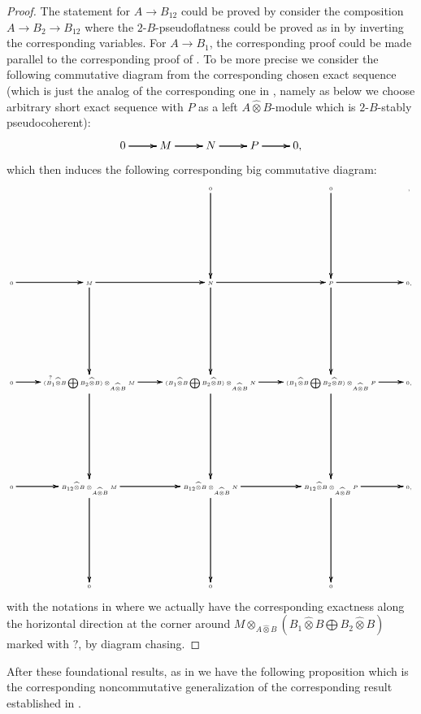 \documentclass[12pt]{amsart}
\theoremstyle{definition}
\numberwithin{equation}{section}
\begin{document}
\begin{proof}
The statement for $A\rightarrow B_{12}$ could be proved by consider the composition $A\rightarrow B_2\rightarrow B_{12}$ where the $2$-$B$-pseudoflatness could be proved as in \cite[Lemma 2.4.13]{KL2} by inverting the corresponding variables. For $A\rightarrow B_{1}$,
the corresponding proof could be made parallel to the corresponding proof of \cite[Lemma 2.4.13]{KL2}. To be more precise we consider the following commutative diagram from the corresponding chosen exact sequence (which is just the analog of the corresponding one in \cite[Remark 2.4.5]{KL2}, namely as below we choose arbitrary short exact sequence with $P$ as a left $A\widehat{\otimes}B$-module which is $2$-$B$-stably pseudocoherent):
\[
\xymatrix@C+0pc@R+0pc{
0   \ar[r]\ar[r]\ar[r] &M \ar[r]\ar[r]\ar[r] &N \ar[r]\ar[r]\ar[r] & P \ar[r]\ar[r]\ar[r] &0,
}
\]
which then induces the following corresponding big commutative diagram:
\[\tiny
\xymatrix@C+0pc@R+5pc{
& &0 \ar[d]\ar[d]\ar[d] &0 \ar[d]\ar[d]\ar[d] &,\\
0   \ar[r]\ar[r]\ar[r]  &M \ar[r]\ar[r]\ar[r] \ar[d]\ar[d]\ar[d] &N \ar[r]\ar[r]\ar[r] \ar[d]\ar[d]\ar[d] & P \ar[r]\ar[r]\ar[r] \ar[d]\ar[d]\ar[d] &0,\\
0   \ar[r]^?\ar[r]\ar[r] &({B_1\widehat{\otimes}B}\bigoplus {B_2\widehat{\otimes}B}) \otimes_{A\widehat{\otimes}B}M  \ar[r]\ar[r]\ar[r] \ar[d]\ar[d]\ar[d] &({B_1\widehat{\otimes}B}\bigoplus {B_2\widehat{\otimes}B})\otimes_{A\widehat{\otimes}B}N  \ar[r]\ar[r]\ar[r] \ar[d]\ar[d]\ar[d] &({B_1\widehat{\otimes}B}\bigoplus {B_2\widehat{\otimes}B})\otimes_{A\widehat{\otimes}B}P\ar[r]\ar[r]\ar[r] \ar[d]\ar[d]\ar[d] &0,\\
0  \ar[r]\ar[r]\ar[r] &{B_{12}\widehat{\otimes}B}\otimes_{A\widehat{\otimes}B}M \ar[r]\ar[r]\ar[r] \ar[d]\ar[d]\ar[d] &{B_{12}\widehat{\otimes}B}\otimes_{A\widehat{\otimes}B}N \ar[r]\ar[r]\ar[r] \ar[d]\ar[d]\ar[d] &{B_{12}\widehat{\otimes}B} \otimes_{A\widehat{\otimes}B} P \ar[r]\ar[r]\ar[r] \ar[d]\ar[d]\ar[d] &0,\\
&0&0&0
}
\]
with the notations in \cite[Lemma 2.4.10]{KL2} where we actually have the corresponding exactness along the horizontal direction at the corner around $M\otimes_{A\widehat{\otimes}B} ({B_1\widehat{\otimes}B}\bigoplus {B_2\widehat{\otimes}B})$ marked with $?$, by diagram chasing.
\end{proof}


\indent After these foundational results, as in \cite{KL2} we have the following proposition which is the corresponding noncommutative generalization of the corresponding result established in \cite[Theorem 2.4.15]{KL2}.
\end{document}
